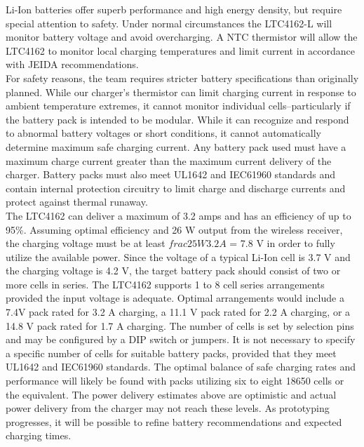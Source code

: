 \documentclass[12pt]{article}
\begin{document}
Li-Ion batteries offer superb performance and high energy density, but require special attention to safety. Under normal circumstances the LTC4162-L will monitor battery voltage and avoid overcharging. A NTC thermistor will allow the LTC4162 to monitor local charging temperatures and limit current in accordance with JEIDA recommendations.\\

\indent
For safety reasons, the team requires stricter battery specifications than originally planned. While our charger’s thermistor can limit charging current in response to ambient temperature extremes, it cannot monitor individual cells--particularly if the battery pack is intended to be modular. While it can recognize and respond to abnormal battery voltages or short conditions, it cannot automatically determine maximum safe charging current. Any battery pack used must have a maximum charge current greater than the maximum current delivery of the charger. Battery packs must also meet UL1642 and IEC61960 standards and contain internal protection circuitry to limit charge and discharge currents and protect against thermal runaway.\\

\indent
The LTC4162 can deliver a maximum of 3.2 amps and has an efficiency of up to 95\%. Assuming optimal efficiency and 26 W output from the wireless receiver, the charging voltage must be at least $frac{25 W}{3.2 A}$ = 7.8 V in order to fully utilize the available power. Since the voltage of a typical Li-Ion cell is 3.7 V and the charging voltage is 4.2 V, the target battery pack should consist of two or more cells in series. The LTC4162 supports 1 to 8 cell series arrangements provided the input voltage is adequate. Optimal arrangements would include a 7.4V pack rated for 3.2 A charging, a 11.1 V pack rated for 2.2 A charging, or a 14.8 V pack rated for 1.7 A charging. The number of cells is set by selection pins and may be configured by a DIP switch or jumpers. It is not necessary to specify a specific number of cells for suitable battery packs, provided that they meet UL1642 and IEC61960 standards. The optimal balance of safe charging rates and performance will likely be found with packs utilizing six to eight 18650 cells or the equivalent. The power delivery estimates above are optimistic and actual power delivery from the charger may not reach these levels. As prototyping progresses, it will be possible to refine battery recommendations and expected charging times.\\
\end{document}
